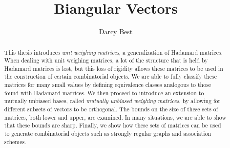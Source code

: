 \documentclass[math,msc]{uleththesis}
\title{Biangular Vectors}
\author{Darcy Best}
\begin{document}
\frontmatter
 
\ulethtitle
\ulethapproval

\dedication{
  To all those who pretended to\\know what I was talking about.\\ And to the few that actually understood.
} %

\begin{abstract}
This thesis introduces {\it unit weighing matrices}, a generalization of Hadamard matrices. When dealing with unit weighing matrices, a lot of the structure that is held by Hadamard matrices is lost, but this loss of rigidity allows these matrices to be used in the construction of certain combinatorial objects. We are able to fully classify these matrices for many small values by defining equivalence classes analogous to those found with Hadamard matrices. We then proceed to introduce an extension to mutually unbiased bases, called {\it mutually unbiased weighing matrices}, by allowing for different subsets of vectors to be orthogonal. The bounds on the size of these sets of matrices, both lower and upper, are examined. In many situations, we are able to show that these bounds are sharp. Finally, we show how these sets of matrices can be used to generate combinatorial objects such as strongly regular graphs and association schemes.
\end{abstract}
\end{document}
